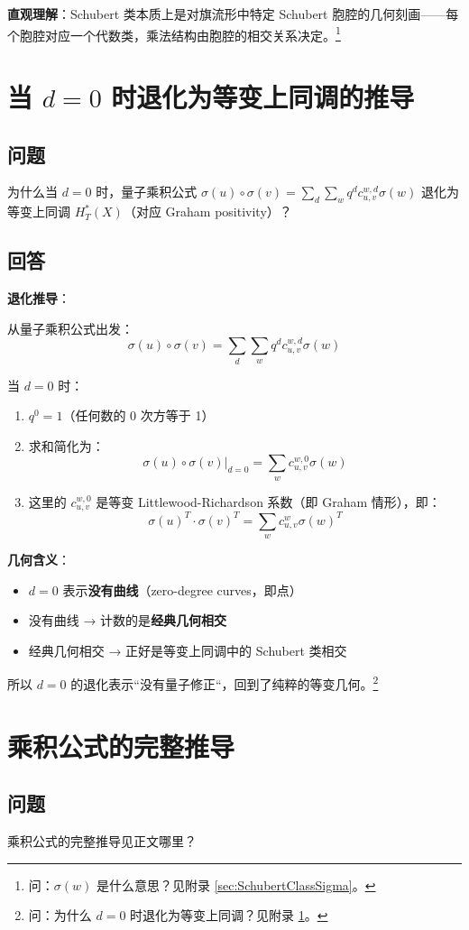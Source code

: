 \textbf{直观理解}：Schubert 类本质上是对旗流形中特定 Schubert 胞腔的几何刻画——每个胞腔对应一个代数类，乘法结构由胞腔的相交关系决定。\footnote{问：$\sigma(w)$ 是什么意思？见附录 \cref{sec:SchubertClassSigma}。}
\section{当 $d = 0$ 时退化为等变上同调的推导}\label{sec:d-zero-degeneracy}
\subsection{问题}
为什么当 $d = 0$ 时，量子乘积公式 $\sigma(u) \circ \sigma(v) = \sum_{d} \sum_{w} q^d c_{u,v}^{w,d} \sigma(w)$ 退化为等变上同调 $H_T^*(X)$（对应 Graham positivity）？
\subsection{回答}
\textbf{退化推导}：

从量子乘积公式出发：
$$\sigma(u) \circ \sigma(v) = \sum_{d} \sum_{w} q^d c_{u,v}^{w,d} \sigma(w)$$

当 $d = 0$ 时：
\begin{enumerate}
\item $q^0 = 1$（任何数的 0 次方等于 1）
\item 求和简化为：
$$\sigma(u) \circ \sigma(v) \big|_{d=0} = \sum_{w} c_{u,v}^{w,0} \sigma(w)$$
\item 这里的 $c_{u,v}^{w,0}$ 是等变 Littlewood-Richardson 系数（即 Graham 情形），即：
$$\sigma(u)^T \cdot \sigma(v)^T = \sum_w c_{u,v}^w \sigma(w)^T$$
\end{enumerate}

\textbf{几何含义}：
\begin{itemize}
\item $d = 0$ 表示\textbf{没有曲线}（zero-degree curves，即点）
\item 没有曲线 → 计数的是\textbf{经典几何相交}
\item 经典几何相交 → 正好是等变上同调中的 Schubert 类相交
\end{itemize}

所以 $d = 0$ 的退化表示``没有量子修正``，回到了纯粹的等变几何。\footnote{问：为什么 $d=0$ 时退化为等变上同调？见附录 \cref{sec:d-zero-degeneracy}。}
\section{乘积公式的完整推导}
\subsection{问题}
乘积公式的完整推导见正文哪里？

